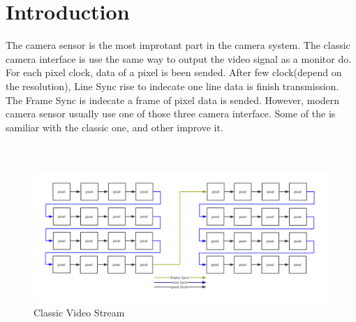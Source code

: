 \documentclass[12pt,article]{memoir}
\begin{document}
\section{Introduction}
The camera sensor is the most improtant part in the camera system. The classic camera interface is use the same way to output the video signal as a monitor do. For each pixel clock, data of a pixel is been sended. After few clock(depend on the resolution), Line Sync rise to indecate one line data is finish transmission. The Frame Sync is indecate a frame of pixel data is sended. However, modern camera sensor usually use one of those three camera interface. Some of the is samiliar with the classic one, and other improve it.\\\\\
\begin{figure}[htp]
\includegraphics[width=\textwidth]{DR00002_Cam.png}
 \caption{Classic Video Stream}	
\end{figure}
\newpage
\end{document}
